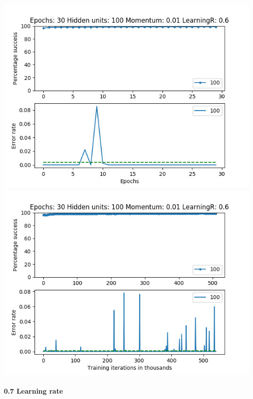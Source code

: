 \documentclass[11pt]{article}
\makeatletter
\def\maxwidth{\ifdim\Gin@nat@width>\linewidth\linewidth
    \else\Gin@nat@width\fi}
\let\Oldincludegraphics\includegraphics
\renewcommand{\includegraphics}[1]{\Oldincludegraphics[width=.8\maxwidth]{#1}}
\makeatother
\begin{document}
\includegraphics{Experiment1/E1_NN_Epoch_Momentum_0.01_30Epochs_100_LR_0.6_Hiddenunits.png}
\includegraphics{Experiment1/E1_NN_Training_Momentum_0.01_30Epochs_100_LR_0.6_Hiddenunits.png}

\hypertarget{learning-rate-6}{%
\paragraph{0.7 Learning rate}\label{learning-rate-6}}
\end{document}
